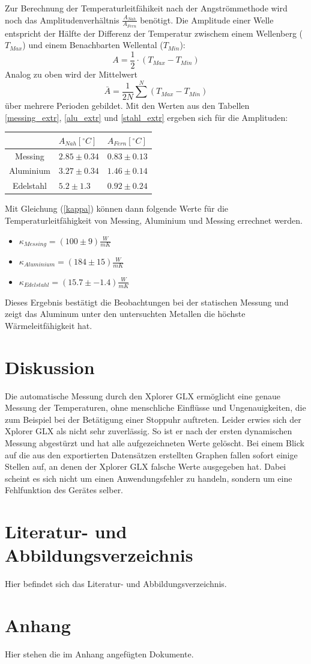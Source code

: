 \documentclass[11pt]{article}
\begin{document}
Zur Berechnung der Temperaturleitfähikeit nach der Angströmmethode wird noch das Amplitudenverhältnis $\frac{A_{Nah}}{A_{Fern}}$ benötigt. Die Amplitude einer Welle entspricht der Hälfte der Differenz der Temperatur zwischem einem Wellenberg ($T_{Max}$) und einem Benachbarten Wellental ($T_{Min}$):
\begin{equation}
A = \frac12\cdot(T_{Max}-T_{Min})
\end{equation}
Analog zu oben wird der Mittelwert
\begin{equation}
\bar {A} = \frac1{2N} \sum^N (T_{Max}-T_{Min})
\end{equation}
über mehrere Perioden gebildet. Mit den Werten aus den Tabellen \ref{messing_extr}, \ref{alu_extr} und \ref{stahl_extr} ergeben sich für die Amplituden:
\begin{table}[H]
\centering
\begin{tabular}{c|l|l}
	& $A_{Nah}[^\circ C]$ & $A_{Fern}[^\circ C]$\\
	\hline
	Messing&$2.85\pm0.34 $& $0.83\pm0.13$ \\
	Aluminium & $3.27\pm0.34$ & $1.46\pm0.14$\\
	Edelstahl & $ 5.2\pm1.3 $ &   $0.92\pm0.24 $\\
\end{tabular}
\end{table}\noindent
\begin{table}[H]

\end{table}\noindent
Mit Gleichung (\ref{kappa}) können dann folgende Werte für die Temperaturleitfähigkeit von Messing, Aluminium und Messing errechnet werden.
\begin{itemize}
\item $\kappa_{Messing} = (100\pm9)\frac{W}{m K}$
\item $\kappa_{Aluminium} = (184\pm15)\frac{W}{m K}$
\item $\kappa_{Edelstahl} = (15.7\pm-1.4)\frac{W}{m K}$
\end{itemize}
Dieses Ergebnis bestätigt die Beobachtungen bei der statischen Messung und zeigt das Aluminum unter den untersuchten Metallen die höchste Wärmeleitfähigkeit hat.

\section{Diskussion}
Die automatische Messung durch den Xplorer GLX ermöglicht eine genaue Messung der Temperaturen, ohne menschliche Einflüsse und Ungenauigkeiten, die zum Beispiel bei der Betätigung einer Stoppuhr auftreten. Leider erwies sich der Xplorer GLX als nicht sehr zuverlässig. So ist er nach der ersten dynamischen Messung abgestürzt und hat alle aufgezeichneten Werte gelöscht.
Bei einem Blick auf die aus den exportierten Datensätzen erstellten Graphen fallen sofort einige Stellen auf, an denen der Xplorer GLX falsche Werte ausgegeben hat. Dabei scheint es sich nicht um einen Anwendungsfehler zu handeln, sondern um eine Fehlfunktion des Gerätes selber.
\section{Literatur- und Abbildungsverzeichnis}
Hier befindet sich das Literatur- und Abbildungsverzeichnis.
\section{Anhang}
Hier stehen die im Anhang angefügten Dokumente.
\end{document}
